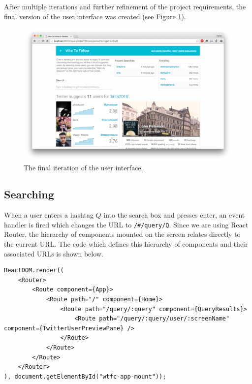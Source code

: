 \documentclass{l4proj}
\newcommand{\code}[1]{\texttt{#1}}
\begin{document}
After multiple iterations and further refinement of the project requirements, the final version of the user interface was created (see Figure \ref{finalscreenshot}).
        
\begin{figure}[H]
\centering
\includegraphics[scale=0.17]{finalscreenshot.png}
\caption{The final iteration of the user interface.}
\label{finalscreenshot}
\end{figure}             
        
        \subsection{Searching}
        When a user enters a hashtag $Q$ into the search box and presses enter, an event handler is fired which changes the URL to \code{/\#/query/Q}. Since we are using React Router, the hierarchy of components mounted on the screen relates directly to the current URL. The code which defines this hierarchy of components and their associated URLs is shown below.
        
\begin{lstlisting}[caption=Definition of the hierarchy of React component and how they map to the URL.]
ReactDOM.render((
    <Router>
        <Route component={App}>
            <Route path="/" component={Home}>
                <Route path="/query/:query" component={QueryResults}>
                    <Route path="/query/:query/user/:screenName" component={TwitterUserPreviewPane} />
                </Route>
            </Route>
        </Route>
    </Router>
), document.getElementById("wtfc-app-mount"));
\end{lstlisting}
         
\end{document}
